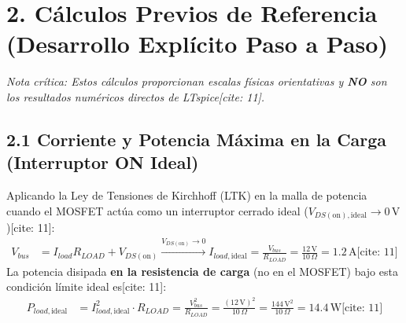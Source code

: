 \documentclass[11pt, a4paper]{article}
\begin{document}
\section*{2. Cálculos Previos de Referencia (Desarrollo Explícito Paso a Paso)}
\textit{Nota crítica: Estos cálculos proporcionan escalas físicas orientativas y \textbf{NO} son los resultados numéricos directos de LTspice[cite: 11].}

\subsection*{2.1 Corriente y Potencia Máxima en la Carga (Interruptor ON Ideal)}
Aplicando la Ley de Tensiones de Kirchhoff (LTK) en la malla de potencia cuando el MOSFET actúa como un interruptor cerrado ideal ($V_{DS(\text{on}),\text{ideal}} \to 0\,\text{V}$)[cite: 11]:
\begin{align}
    V_{bus} &= I_{load} R_{LOAD} + V_{DS(\text{on})} \xrightarrow{V_{DS(\text{on})} \to 0} I_{load,\text{ideal}} = \frac{V_{bus}}{R_{LOAD}} = \frac{12\,\text{V}}{10\,\Omega} = 1.2\,\text{A} \text{[cite: 11]}
\end{align}
La potencia disipada \textbf{en la resistencia de carga} (no en el MOSFET) bajo esta condición límite ideal es[cite: 11]:
\begin{align}
    P_{load,\text{ideal}} &= I_{load,\text{ideal}}^2 \cdot R_{LOAD} = \frac{V_{bus}^2}{R_{LOAD}} = \frac{(12\,\text{V})^2}{10\,\Omega} = \frac{144\,\text{V}^2}{10\,\Omega} = 14.4\,\text{W} \text{[cite: 11]}
\end{align}
\end{document}
